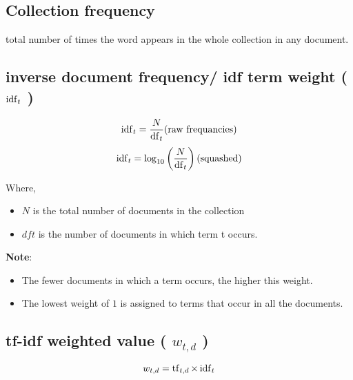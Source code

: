 \subsection{Collection frequency \cite{nlp-1}}\label{Collection frequency}
total number of times the word appears in the whole collection in any document.

\subsection{inverse document frequency/ idf term weight ( $\operatorname{idf}_t$ )}\label{inverse document frequency/ idf term weight}
\[
    \rcmdXidf_t = \displaystyle\frac{N}{\rcmdXdf_t} \hfill \text{(raw frequancies)}
\]
\[
    \rcmdXidf_t = \log_{10} \left(\displaystyle\frac{N}{\rcmdXdf_t} \right) \hfill \text{(squashed)}
\]

Where,
\begin{itemize}
    \item $N$ is the total number of documents in the collection
    \item $dft$ is the number of documents in which term t occurs.
\end{itemize}

\vspace{0.2cm}
\textbf{Note}:
\begin{itemize}
    \item The fewer documents in which a term occurs, the higher this weight.

    \item The lowest weight of $1$ is assigned to terms that occur in all the documents.

    
\end{itemize}


\subsection{tf-idf weighted value ( $w_{t,d}$ ) \cite{nlp-1}}\label{tf-idf weighted value}
\[
    w_{t,d} = \operatorname{tf}_{t,d} \times\operatorname{idf}_t
\]


